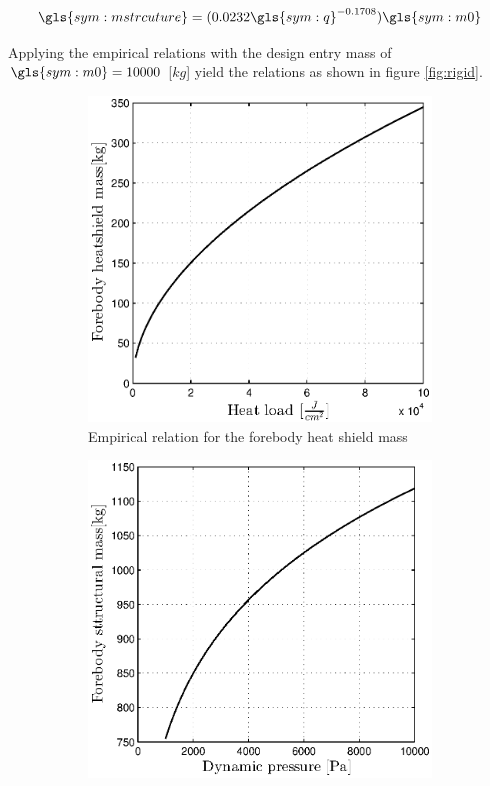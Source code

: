 \begin{equation}
\gls{sym:mstrcuture} = (0.0232 \gls{sym:q} ^{-0.1708} ) \gls{sym:m0}
\label{eq:m_structure}
\end{equation}

Applying the empirical relations with the design entry mass of $\gls{sym:m0} = 10000$ [$kg$] yield the relations as shown in figure \ref{fig:rigid}.

\begin{figure}[h]
	\centering
	\begin{subfigure}[b]{0.49\textwidth}
	\centering
	\includegraphics[width=1.0\textwidth]{Figure/rigidheat.eps}
	\caption{Empirical relation for the forebody heat shield mass} 
	\label{rigidheat}
	\end{subfigure}
	\begin{subfigure}[b]{0.49\textwidth}
	\centering
	\includegraphics[width=1.0\textwidth]{Figure/rigidstruct.eps}

\end{subfigure}
\end{figure}
